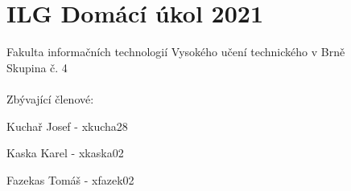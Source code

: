 \section*{ILG Domácí úkol 2021}
Fakulta informačních technologií Vysokého učení technického v Brně \\
Skupina č. 4 \\\\
Zbývající členové:

Kuchař Josef - xkucha28

Kaska Karel - xkaska02

Fazekas Tomáš - xfazek02